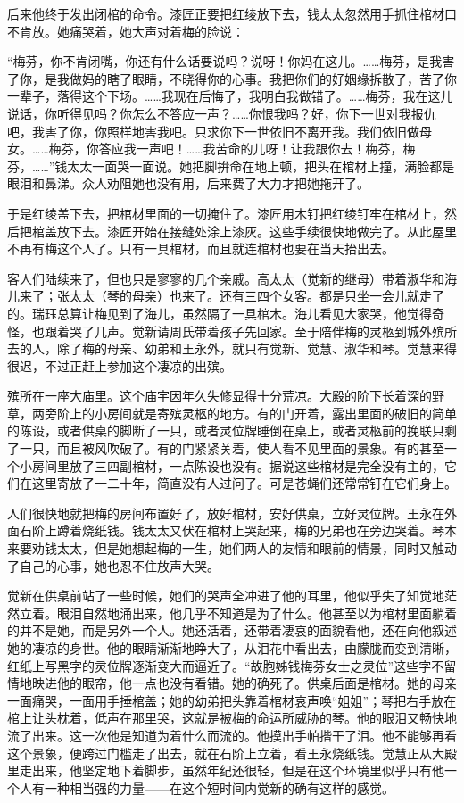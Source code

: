 \par 后来他终于发出闭棺的命令。漆匠正要把红绫放下去，钱太太忽然用手抓住棺材口不肯放。她痛哭着，她大声对着梅的脸说：
\par “梅芬，你不肯闭嘴，你还有什么话要说吗？说呀！你妈在这儿。……梅芬，是我害了你，是我做妈的瞎了眼睛，不晓得你的心事。我把你们的好姻缘拆散了，苦了你一辈子，落得这个下场。……我现在后悔了，我明白我做错了。……梅芬，我在这儿说话，你听得见吗？你怎么不答应一声？……你恨我吗？好，你下一世对我报仇吧，我害了你，你照样地害我吧。只求你下一世依旧不离开我。我们依旧做母女。……梅芬，你答应我一声吧！……我苦命的儿呀！让我跟你去！梅芬，梅芬，……”钱太太一面哭一面说。她把脚拚命在地上顿，把头在棺材上撞，满脸都是眼泪和鼻涕。众人劝阻她也没有用，后来费了大力才把她拖开了。
\par 于是红绫盖下去，把棺材里面的一切掩住了。漆匠用木钉把红绫钉牢在棺材上，然后把棺盖放下去。漆匠开始在接缝处涂上漆灰。这些手续很快地做完了。从此屋里不再有梅这个人了。只有一具棺材，而且就连棺材也要在当天抬出去。
\par 客人们陆续来了，但也只是寥寥的几个亲戚。高太太（觉新的继母）带着淑华和海儿来了；张太太（琴的母亲）也来了。还有三四个女客。都是只坐一会儿就走了的。瑞珏总算让梅见到了海儿，虽然隔了一具棺木。海儿看见大家哭，他觉得奇怪，也跟着哭了几声。觉新请周氏带着孩子先回家。至于陪伴梅的灵柩到城外殡所去的人，除了梅的母亲、幼弟和王永外，就只有觉新、觉慧、淑华和琴。觉慧来得很迟，不过正赶上参加这个凄凉的出殡。
\par 殡所在一座大庙里。这个庙宇因年久失修显得十分荒凉。大殿的阶下长着深的野草，两旁阶上的小房间就是寄殡灵柩的地方。有的门开着，露出里面的破旧的简单的陈设，或者供桌的脚断了一只，或者灵位牌睡倒在桌上，或者灵柩前的挽联只剩了一只，而且被风吹破了。有的门紧紧关着，使人看不见里面的景象。有的甚至一个小房间里放了三四副棺材，一点陈设也没有。据说这些棺材是完全没有主的，它们在这里寄放了一二十年，简直没有人过问了。可是苍蝇们还常常钉在它们身上。
\par 人们很快地就把梅的房间布置好了，放好棺材，安好供桌，立好灵位牌。王永在外面石阶上蹲着烧纸钱。钱太太又伏在棺材上哭起来，梅的兄弟也在旁边哭着。琴本来要劝钱太太，但是她想起梅的一生，她们两人的友情和眼前的情景，同时又触动了自己的心事，她也忍不住放声大哭。
\par 觉新在供桌前站了一些时候，她们的哭声全冲进了他的耳里，他似乎失了知觉地茫然立着。眼泪自然地涌出来，他几乎不知道是为了什么。他甚至以为棺材里面躺着的并不是她，而是另外一个人。她还活着，还带着凄哀的面貌看他，还在向他叙述她的凄凉的身世。他的眼睛渐渐地睁大了，从泪花中看出去，由朦胧而变到清晰，红纸上写黑字的灵位牌逐渐变大而逼近了。“故胞姊钱梅芬女士之灵位”这些字不留情地映进他的眼帘，他一点也没有看错。她的确死了。供桌后面是棺材。她的母亲一面痛哭，一面用手捶棺盖；她的幼弟把头靠着棺材哀声唤“姐姐”；琴把右手放在棺上让头枕着，低声在那里哭，这就是被梅的命运所威胁的琴。他的眼泪又畅快地流了出来。这一次他是知道为着什么而流的。他摸出手帕揩干了泪。他不能够再看这个景象，便跨过门槛走了出去，就在石阶上立着，看王永烧纸钱。觉慧正从大殿里走出来，他坚定地下着脚步，虽然年纪还很轻，但是在这个环境里似乎只有他一个人有一种相当强的力量——在这个短时间内觉新的确有这样的感觉。
